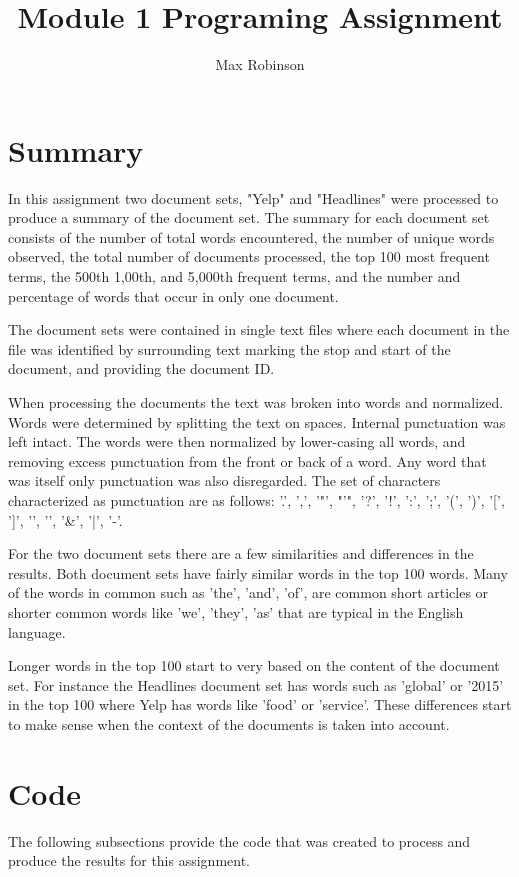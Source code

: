 \documentclass{article}
\begin{document}
\title{Module 1 Programing Assignment}
\author{Max Robinson}
\maketitle

\section{Summary}
In this assignment two document sets, "Yelp" and "Headlines" were processed to produce a summary of the document set. The summary for each document set consists of the number of total words encountered, the number of unique words observed, the total number of documents processed, the top 100 most frequent terms, the 500th 1,00th, and 5,000th frequent terms, and the number and percentage of words that occur in only one document. 

The document sets were contained in single text files where each document in the file was identified by surrounding text marking the stop and start of the document, and providing the document ID. 

When processing the documents the text was broken into words and normalized. Words were determined by splitting the text on spaces. Internal punctuation was left intact. The words were then normalized by lower-casing all words, and removing excess punctuation from the front or back of a word. Any word that was itself only punctuation was also disregarded. The set of characters characterized as punctuation are as follows: '.',  ',', '"', "'", '?', '!', ':', ';', '(', ')', '[', ']', '{', '}', '\&', '|', '-'.

For the two document sets there are a few similarities and differences in the results. Both document sets have fairly similar words in the top 100 words. Many of the words in common such as 'the', 'and', 'of', are common short articles or shorter common words like 'we', 'they', 'as'  that are typical in the English language. 

Longer words in the top 100 start to very based on the content of the document set. For instance the Headlines document set has words such as 'global' or '2015' in the top 100 where Yelp has words like 'food' or 'service'. These differences start to make sense when the context of the documents is taken into account. 

\section{Code}
The following subsections provide the code that was created to process and produce the results for this assignment. 
\end{document}
